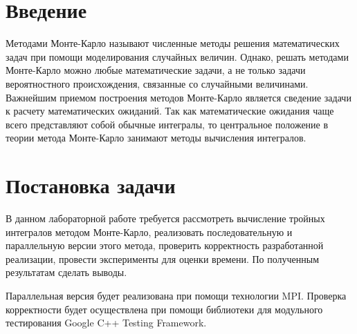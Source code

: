 \documentclass{report}
\begin{document}
\setcounter{page}{2}

\tableofcontents
\newpage

\section*{Введение}
\par Методами Монте-Карло называют численные методы решения математических задач при помощи моделирования случайных величин. Однако, решать методами Монте-Карло можно любые математические задачи, а не только задачи вероятностного происхождения, связанные со случайными величинами. Важнейшим приемом построения методов Монте-Карло является сведение задачи к расчету математических ожиданий. Так как математические ожидания чаще всего представляют собой обычные интегралы, то центральное положение в теории метода Монте-Карло занимают методы вычисления интегралов.
\newpage

\section*{Постановка задачи}
\par В данном лабораторной работе требуется рассмотреть вычисление тройных интегралов методом Монте-Карло, реализовать последовательную и параллельную версии этого метода, проверить корректность разработанной реализации, провести эксперименты для оценки времени. По полученным результатам сделать выводы.
\par Параллельная версия будет реализована при помощи технологии MPI. Проверка корректности будет осуществлена при помощи библиотеки для модульного тестирования Google C++ Testing Framework.
\newpage

\end{document}
